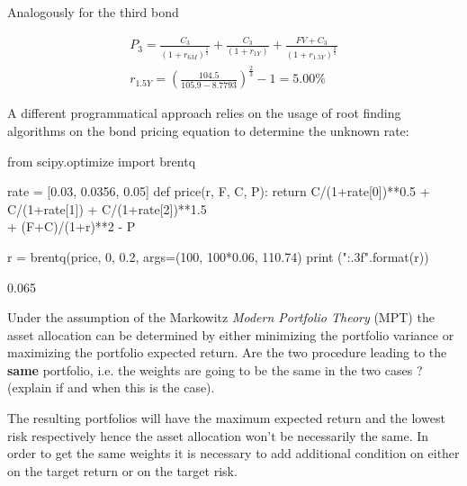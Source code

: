 \documentclass[12pt,a4paper]{exam}
\begin{document}
\begin{questions}
\begin{solution}
Analogously for the third bond

\begin{equation*}
  \begin{gathered}
    P_3 =  \frac{C_3}{(1+r_{6M})^{\frac{1}{2}}} + \frac{C_3}{(1+r_{1Y})} +  \frac{FV+C_3}{(1+r_{1.5Y})^{\frac{2}{3}}} \\
    r_{1.5Y} = \left(\frac{104.5}{105.9-8.7793}\right)^{\frac{2}{3}}-1 = 5.00\%
  \end{gathered}
\end{equation*}

A different programmatical approach relies on the usage of root finding algorithms on the bond pricing equation to determine the unknown rate:
\begin{ipython}
from scipy.optimize import brentq

rate = [0.03, 0.0356, 0.05]
def price(r, F, C, P):
    return C/(1+rate[0])**0.5 + C/(1+rate[1]) + C/(1+rate[2])**1.5 \\
        + (F+C)/(1+r)**2 - P

r = brentq(price, 0, 0.2, args=(100, 100*0.06, 110.74)
print ("{:.3f}".format(r))
\end{ipython}
\begin{ioutput}
0.065
\end{ioutput}
\end{solution}

\question
Under the assumption of the Markowitz \emph{Modern Portfolio Theory} (MPT) the asset allocation can be determined by either minimizing the portfolio variance or maximizing the portfolio expected return. Are the two procedure leading to the \textbf{same} portfolio, i.e. the weights are going to be the same in the two cases ? (explain if and when this is the case).
\fillwithlines{3cm}
\begin{solution}
The resulting portfolios will have the maximum expected return and the lowest risk respectively hence the asset allocation won't be necessarily the same. In order to get the same weights it is necessary to add additional condition on either on the target return or on the target risk.
\end{solution}


\end{questions}
\end{document}
